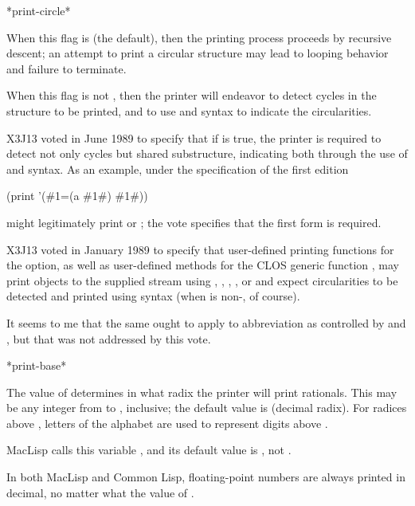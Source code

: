 \begin{defun}[Variable]
*print-circle*

When this flag is {\false} (the default), then the printing process proceeds
by recursive descent; an attempt to print a circular structure may lead
to looping behavior and failure to terminate.

\begin{obsolete}
When this flag is not {\false}, then the printer will endeavor to detect
cycles in the structure to be printed, and to use  and 
syntax to indicate the circularities.
\end{obsolete}

\begin{newer}
X3J13 voted in June 1989 
to specify that if  is true, the printer is required
to detect not only cycles but shared substructure, indicating both through the
use of  and  syntax.
As an example, under the specification of the first edition
\begin{lisp}
(print '(\#1=(a \#1\#) \#1\#))
\end{lisp}
might legitimately print  or
; the vote specifies that the first
form is required.
\end{newer}

\begin{new}
X3J13 voted in January 1989
to specify that user-defined printing functions for the 
 option, as well as user-defined methods for the
CLOS generic function , may print objects to the
supplied stream using , , , ,
or  and expect circularities to be detected and printed
using  syntax (when  is non-, of course).

It seems to me that the same ought to apply to abbreviation
as controlled by  and , but that
was not addressed by this vote.
\end{new}
\end{defun}

\begin{defun}[Variable]
*print-base*

The value of  determines in what radix the printer will print
rationals.  This may be any integer from  to , inclusive;
the default value is  (decimal radix).
For radices above , letters of the alphabet are used to represent
digits above .

\beforenoterule
\begin{incompatibility}
MacLisp calls this variable , and its default value is , not .

In both MacLisp and Common Lisp,
floating-point numbers are always printed in decimal, no matter what the value
of .
\end{incompatibility}
\afternoterule
\end{defun}

